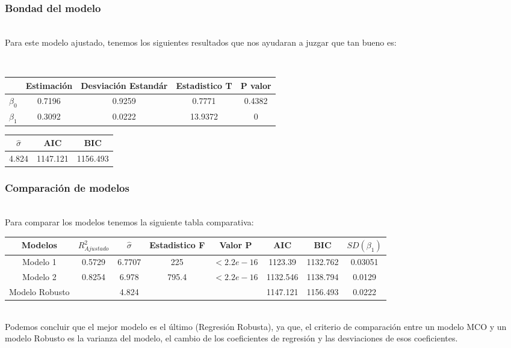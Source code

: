 \documentclass[12pt]{beamer}
\begin{document}
\begin{frame}
\frametitle{Bondad del modelo}
~\\Para este modelo ajustado, tenemos los siguientes resultados que nos ayudaran a juzgar que tan bueno es:
\begin{center}
~\\\begin{tabular}{|c|c|c|c|c|}
\hline 
 & Estimación & Desviación Estandár & Estadistico T & P valor \\ 
\hline 
$\beta_{0}$ & 0.7196 & 0.9259 & 0.7771 & 0.4382 \\ 
\hline 
$\beta_{1}$ & 0.3092 & 0.0222 & 13.9372 & 0 \\ 
\hline 
\end{tabular} 
\end{center}
\begin{center}
\begin{tabular}{|c|c|c|}
\hline 
 $\hat{\sigma}$ & AIC & BIC \\ 
\hline 
 4.824 & 1147.121 & 1156.493 \\ 
\hline 
\end{tabular} 
\end{center}
\end{frame}

\begin{frame}
\frametitle{Comparación de modelos}
~\\Para comparar los modelos tenemos la siguiente tabla comparativa:
\resizebox{12.2cm}{!} {
\begin{tabular}{|c|c|c|c|c|c|c|c|}
 \hline 
 Modelos & $R^{2}_{Ajustado}$ & $\hat{\sigma}$ & Estadistico F & Valor P & AIC & BIC & $SD(\beta_{1})$ \\ 
 \hline 
 Modelo 1 & 0.5729 & 6.7707 & 225 & $<2.2e-16$ & 1123.39 & 1132.762 & 0.03051  \\ 
 \hline 
 Modelo 2 & 0.8254 & 6.978 & 795.4 & $<2.2e-16$ & 1132.546 & 1138.794 & 0.0129\\ 
 \hline 
 Modelo Robusto &    & 4.824 &  &  & 1147.121 & 1156.493 & 0.0222 \\
 \hline 
 \end{tabular}
 }  
~\\Podemos concluir que el mejor modelo es el último (Regresión Robusta), ya que, el criterio de comparación entre un modelo MCO y un modelo Robusto es la varianza del modelo, el cambio de los coeficientes de regresión y las desviaciones de esos coeficientes.
\end{frame}
\end{document}
